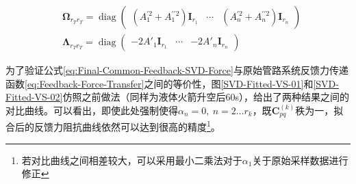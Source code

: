 \begin{displaymath}
\begin{aligned}
		&\boldsymbol{\Omega}_{r_Tr_T}=\operatorname{diag} \left( 
		\begin{matrix}
		   ({A}_{1}^{\prime 2}+{A}^{\prime\prime 2}_{1}) \boldsymbol{I}_{r_1} & \cdots & ({A}_{n}^{\prime 2}+{A}_{n}^{\prime\prime 2})\boldsymbol{I}_{r_n}
		\end{matrix} 
		\right) \\
		&\boldsymbol{\Lambda}_{r_Tr_T}=\operatorname{diag}\left( 
		\begin{matrix}
		   -2A'_{1}\boldsymbol{I}_{r_1} & \cdots & -2{A'_{n}}\boldsymbol{I}_{r_n}
		\end{matrix} 
		\right)
	\end{aligned}
\end{displaymath}

为了验证公式\eqref{eq:Final-Common-Feedback-SVD-Force}与原始管路系统反馈力传递函数\eqref{eq:Feedback-Force-Transfer}之间的等价性，图\ref{SVD-Fitted-VS-01}和\ref{SVD-Fitted-VS-02}仿照之前做法（同样为液体火箭升空后60s），给出了两种结果之间的对比曲线。可以看出，即使此处强制使得$\alpha_n=0,\ n=2\dots r_k$，既$\boldsymbol{C}_{pq}^{(k)}$秩为一，拟合后的反馈力阻抗曲线依然可以达到很高的精度\footnote{若对比曲线之间相差较大，可以采用最小二乘法对于$\alpha_1$关于原始采样数据进行修正}。

